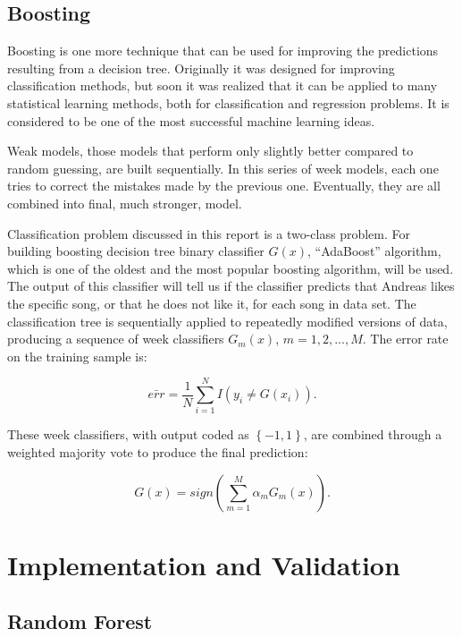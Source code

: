 \documentclass{article}
\begin{document}
\subsection{Boosting}

Boosting is one more technique that can be used for improving the predictions resulting from a decision tree. Originally it was designed for improving classification methods, but soon it was realized that it can be applied to many statistical learning methods, both for classification and regression problems. It is considered to be one of the most successful machine learning ideas.

Weak models, those models that perform only slightly better compared to random guessing, are built sequentially. In this series of week models, each one tries to correct the mistakes made by the previous one. Eventually, they are all combined into final, much stronger, model. 

Classification problem discussed in this report is a two-class problem. For building boosting decision tree binary classifier $G(x)$, ``AdaBoost'' algorithm, which is one of the oldest and the most popular boosting algorithm, will be used. The output of this classifier will tell us if the classifier predicts that Andreas likes the specific song, or that he does not like it, for each song in data set. The classification tree is sequentially applied to repeatedly modified versions of data, producing a sequence of week classifiers $G_m(x)$, $m=1,2,...,M$. The error rate on the training sample is:

\begin{equation} \label{boost_error_rate}
\bar{err}=\frac{1}{N}\sum_{i=1}^{N}I(y_i\neq G(x_i)).
\end{equation}

These week classifiers, with output coded as $\left\{-1,1\right\}$, are combined through a weighted
majority vote to produce the final prediction:

\begin{equation} \label{boost_final_pred}
G(x)=sign(\sum_{m=1}^{M}\alpha_m G_m(x)).
\end{equation}

\section{Implementation and Validation}

\subsection{Random Forest}
\end{document}

